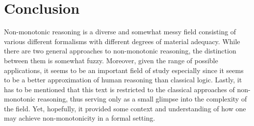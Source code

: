 \documentclass{extarticle}
\begin{document}
\section{Conclusion}
Non-monotonic reasoning is a diverse and somewhat messy field consisting of various different formalisms with different degrees of material adequacy. While there are two general approaches to non-monotonic reasoning, the distinction between them is somewhat fuzzy. Moreover, given the range of possible applications, it seems to be an important field of study especially since it seems to be a better approximation of human reasoning than classical logic. Lastly, it has to be mentioned that this text is restricted to the classical approaches of non-monotonic reasoning, thus serving only as a small glimpse into the complexity of the field. Yet, hopefully, it provided some context and understanding of how one may achieve non-monotonicity in a formal setting.
\end{document}
